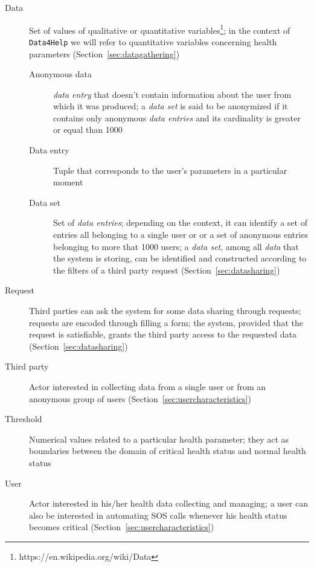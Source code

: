     \begin{description}
      \item[Data] Set of values of qualitative or quantitative variables\footnote{https://en.wikipedia.org/wiki/Data}; in the context of \texttt{Data4Help} we will refer to quantitative variables concerning health parameters (Section~\ref{sec:datagathering})
      \begin{description}
        \item[Anonymous data] \textit{data entry} that doesn't contain information about the user from which it was produced; a \textit{data set} is said to be anonymized if it contains only anonymous \textit{data entries} and its cardinality is greater or equal than 1000
        \item[Data entry] Tuple that corresponds to the user's parameters in a particular moment
        \item[Data set] Set of \textit{data entries}; depending on the context, it can identify a set of entries all belonging to a single user or or a set of anonymous entries belonging to more that 1000 users; a \textit{data set}, among all \textit{data} that the system is storing, can be identified and constructed according to the filters of a third party request (Section~\ref{sec:datasharing})
      \end{description}
      \item[Request] Third parties can ask the system for some data sharing through requests; requests are encoded through filling a form; the system, provided that the request is satisfiable, grants the third party access to the requested data (Section~\ref{sec:datasharing})
      \item[Third party] Actor interested in collecting data from a single user or from an anonymous group of users (Section~\ref{sec:usercharacteristics})
      \item[Threshold] Numerical values related to a particular health parameter; they act as boundaries between the domain of critical health status and normal health status
      \item[User] Actor interested in his/her health data collecting and managing; a user can also be interested in automating SOS calls whenever his health status becomes critical (Section~\ref{sec:usercharacteristics})

    \end{description}

